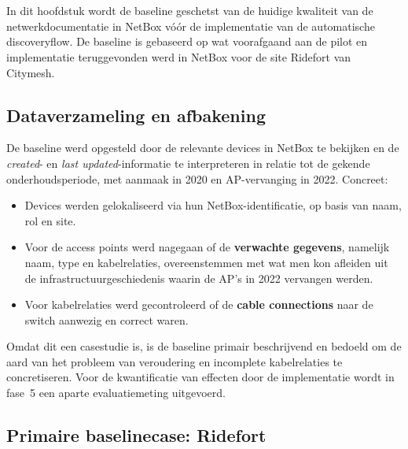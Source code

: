 
\chapter{}%
\label{ch:fase3}

In dit hoofdstuk wordt de baseline geschetst van de huidige kwaliteit van de netwerkdocumentatie in NetBox vóór de implementatie van de automatische discoveryflow. De baseline is gebaseerd op wat voorafgaand aan de pilot en implementatie teruggevonden werd in NetBox voor de site Ridefort van Citymesh.

\section{Dataverzameling en afbakening}

De baseline werd opgesteld door de relevante devices in NetBox te bekijken en de \emph{created}- en \emph{last updated}-informatie te interpreteren in relatie tot de gekende onderhoudsperiode, met aanmaak in 2020 en AP-vervanging in 2022. Concreet:

\begin{itemize}
  \item Devices werden gelokaliseerd via hun NetBox-identificatie, op basis van naam, rol en site.
  \item Voor de access points werd nagegaan of de \textbf{verwachte gegevens}, namelijk naam, type en kabelrelaties, overeenstemmen met wat men kon afleiden uit de infrastructuurgeschiedenis waarin de AP's in 2022 vervangen werden.
  \item Voor kabelrelaties werd gecontroleerd of de \textbf{cable connections} naar de switch aanwezig en correct waren.
\end{itemize}

Omdat dit een casestudie is, is de baseline primair beschrijvend en bedoeld om de aard van het probleem van veroudering en incomplete kabelrelaties te concretiseren. Voor de kwantificatie van effecten door de implementatie wordt in fase~5 een aparte evaluatiemeting uitgevoerd.

\section{Primaire baselinecase: Ridefort}

